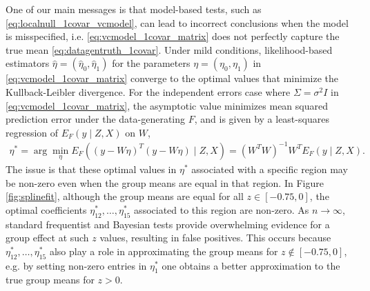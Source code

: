 One of our main messages is that model-based tests, such as \eqref{eq:localnull_1covar_vcmodel}, can lead to incorrect conclusions when the model is misspecified, i.e. \eqref{eq:vcmodel_1covar_matrix} does not perfectly capture the true mean \eqref{eq:datagentruth_1covar}.
Under mild conditions, likelihood-based estimators $\hat{\eta}=(\hat{\eta}_0,\hat{\eta}_1)$ for the parameters $\eta=(\eta_0,\eta_1)$ in \eqref{eq:vcmodel_1covar_matrix} converge to the optimal values that minimize the Kullback-Leibler divergence. 
For the independent errors case  where $\Sigma= \sigma^2 I$  in \eqref{eq:vcmodel_1covar_matrix}, the asymptotic value minimizes mean squared prediction error under the data-generating $F$, and is given by a least-squares regression of $E_F(y \mid Z,X)$ on $W$,
\begin{align}
\eta^*= \arg\min_\eta E_F \left( (y - W\eta)^T (y - W\eta) \mid Z,X \right)= (W^T W)^{-1} W^T E_F (y \mid Z,X).
\label{eq:asympsolution_indep}
\end{align}
The issue is that these optimal values in $\eta^*$ associated with a specific region may be non-zero even when the group means are equal in that region. In Figure \ref{fig:splinefit},
 although the group means are equal for all $z \in [-0.75,0]$, the optimal coefficients $\eta_{12}^*,\ldots,\eta_{15}^*$ associated to this region are non-zero.
 As $n \rightarrow \infty$, standard frequentist and Bayesian tests  provide overwhelming evidence for a group effect at such $z$ values, resulting in false positives. %
This occurs because $\eta_{12}^*,\ldots,\eta_{15}^*$ also play a role in approximating the group means for $z \not\in [-0.75,0]$, e.g. by setting non-zero entries in $\eta_1^*$ one obtains a better approximation to the true group means for $z>0$.

